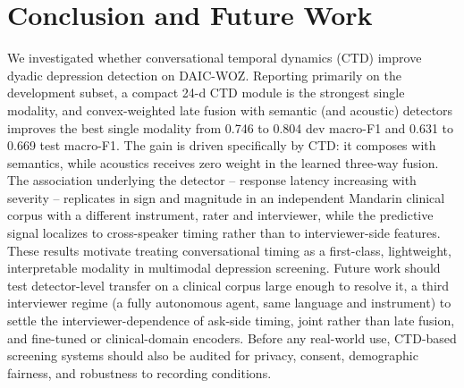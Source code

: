 \documentclass{article}
\begin{document}
\section{Conclusion and Future Work}
\vspace{-1mm}
We investigated whether conversational temporal dynamics (CTD) improve dyadic depression detection on DAIC-WOZ. Reporting primarily on the development subset, a compact 24-d CTD module is the strongest single modality, and convex-weighted late fusion with semantic (and acoustic) detectors improves the best single modality from 0.746 to 0.804 dev macro-F1 and 0.631 to 0.669 test macro-F1. The gain is driven specifically by CTD: it composes with semantics, while acoustics receives zero weight in the learned three-way fusion. The association underlying the detector -- response latency increasing with severity -- replicates in sign and magnitude in an independent Mandarin clinical corpus with a different instrument, rater and interviewer, while the predictive signal localizes to cross-speaker timing rather than to interviewer-side features. These results motivate treating conversational timing as a first-class, lightweight, interpretable modality in multimodal depression screening. Future work should test detector-level transfer on a clinical corpus large enough to resolve it, a third interviewer regime (a fully autonomous agent, same language and instrument) to settle the interviewer-dependence of ask-side timing, joint rather than late fusion, and fine-tuned or clinical-domain encoders. Before any real-world use, CTD-based screening systems should also be audited for privacy, consent, demographic fairness, and robustness to recording conditions.



\end{document}
